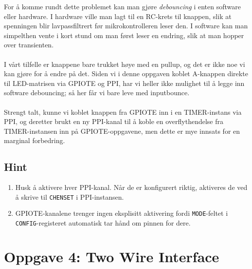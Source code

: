 \documentclass[11pt,a4paper]{article}
\begin{document}
For å komme rundt dette problemet kan man gjøre \textit{debouncing} i enten software eller hardware. I hardware ville man lagt til en RC-krets til knappen, slik at spenningen blir lavpassfiltrert før mikrokontrolleren leser den. I software kan man simpelthen vente i kort stund om man først leser en endring, slik at man hopper over transienten.\\
\\
I vårt tilfelle er knappene bare trukket høye med en pullup, og det er ikke noe vi kan gjøre for å endre på det. Siden vi i denne oppgaven koblet A-knappen direkte til LED-matrisen via GPIOTE og PPI, har vi heller ikke mulighet til å legge inn software debouncing; så her får vi bare leve med inputbounce.\\
\\
Strengt talt, kunne vi koblet knappen fra GPIOTE inn i en TIMER-instans via PPI, og deretter brukt en ny PPI-kanal til å koble en overflythendelse fra TIMER-instansen inn på GPIOTE-oppgavene, men dette er mye innsats for en marginal forbedring.

\subsection{Hint}
\begin{enumerate}
\item Husk å aktivere hver PPI-kanal. Når de er konfigurert riktig, aktiveres de ved å skrive til \texttt{CHENSET} i PPI-instansen.
\item GPIOTE-kanalene trenger ingen eksplisitt aktivering fordi \texttt{MODE}-feltet i \texttt{CONFIG}-registeret automatisk tar hånd om pinnen for dere.
\end{enumerate}

\section{Oppgave 4: Two Wire Interface}
\end{document}
